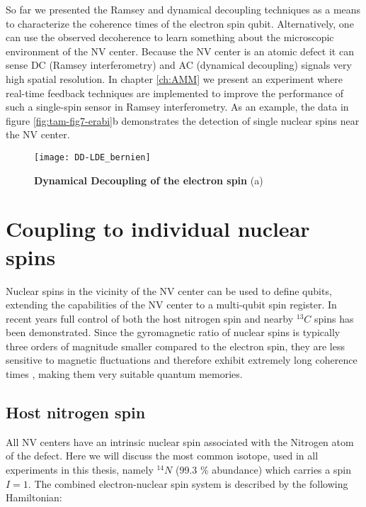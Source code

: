 So far we presented the Ramsey and dynamical decoupling techniques as a means to characterize the coherence times of the electron spin qubit. Alternatively, one can use the observed decoherence to learn something about the microscopic environment of the NV center. Because the NV center is an atomic defect it can sense DC (Ramsey interferometry) and AC (dynamical decoupling) signals very high spatial resolution. In chapter \ref{ch:AMM} we present an experiment where real-time feedback techniques are implemented to improve the performance of such a single-spin sensor in Ramsey interferometry. As an example, the data in figure \ref{fig:tam-fig7-erabi}b demonstrates the detection of single nuclear spins near the NV center.

\begin{figure*}
	\centering
	\texttt{[image: DD-LDE\_bernien]}
	\caption{\label{fig:tam-fig9-DD} \textbf{Dynamical Decoupling of the electron spin} (a) }
\end{figure*}

\section{Coupling to individual nuclear spins}
Nuclear spins in the vicinity of the NV center can be used to define qubits, extending the capabilities of the NV center to a multi-qubit spin register. In recent years full control of both the host nitrogen spin \cite{Gaebel_NatPhys_2006,Hanson_Phys.Rev.Lett._2006,Neumann_Science_2010,Fuchs_NatPhys_2011,vanderSar_Nature_2012} and nearby $^{13}C$ spins \cite{Jelezko_Phys.Rev.Lett._2004,Dutt_Science_2007,Neumann_Science_2008,Jiang_Science_2009,Smeltzer_Phys.Rev.A_2009,Taminiau_Phys.Rev.Lett._2012} has been demonstrated. Since the gyromagnetic ratio of nuclear spins is typically three orders of magnitude smaller compared to the electron spin, they are less sensitive to magnetic fluctuations and therefore exhibit extremely long coherence times \cite{Maurer_Science_2012}, making them very suitable quantum memories.

\subsection{Host nitrogen spin}
All NV centers have an intrinsic nuclear spin associated with the Nitrogen atom of the defect. Here we will discuss the most common isotope, used in all experiments in this thesis, namely $^{14}N$ (99.3 $\%$ abundance) which carries a spin $I = 1$. The combined electron-nuclear spin system is described by the following Hamiltonian:

